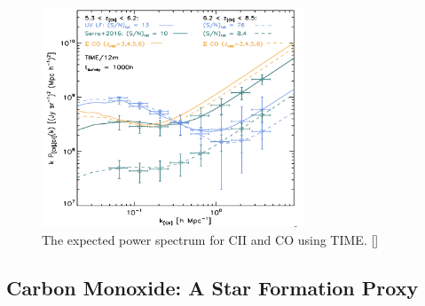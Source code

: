 \documentclass[manuscript]{aastex}
\begin{document}
\begin{figure}[h!]
\centering
\captionsetup{width=0.7\textwidth}
\includegraphics[width=0.7\textwidth]{bock1.png}
\caption[The expected power spectrum for CII and CO using TIME. -()]{The expected power spectrum for CII and CO using TIME. [\cite{Crites2014}]}
\end{figure}

\subsection{Carbon Monoxide: A Star Formation Proxy}
\end{document}
